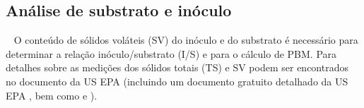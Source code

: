 \documentclass[]{article}
\begin{document}
\subsection{Análise de substrato e inóculo}
\label{sec: análise}
  O conteúdo de sólidos voláteis (SV) do inóculo e do substrato é necessário para determinar a relação inóculo/substrato (I/S) e para o cálculo de PBM. Para detalhes sobre as medições dos sólidos totais (TS) e SV podem ser encontrados no documento da US EPA (incluindo um documento gratuito detalhado da US EPA \citep{epaMethod1684Total2001}, bem como \citet{strachDeterminationTotalSolids2016} e \citet{bairdStandardMethodsExamination2017}). 
 
\end{document}
